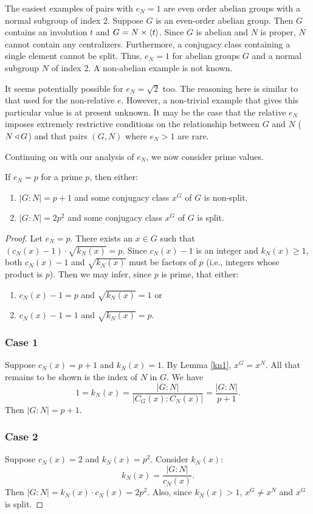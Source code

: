 \documentclass[main.tex]{subfiles}
\begin{document}
The easiest examples of pairs with $e_N = 1$ are even order abelian groups with a normal subgroup of index 2. Suppose $G$ is an even-order abelian group. Then $G$ contains an involution $t$ and $G = N \times \langle t \rangle$. Since $G$ is abelian and $N$ is proper, $N$ cannot contain any centralizers. Furthermore, a conjugacy class containing a single element cannot be split. Thus, $e_N = 1$ for abelian groups $G$ and a normal subgroup $N$ of index 2. A non-abelian example is not known.

It seems potentially possible for $e_N = \sqrt{2}$ too. The reasoning here is similar to that used for the non-relative $e$. However, a non-trivial example that gives this particular value is at present unknown. It may be the case that the relative $e_N$ imposes extremely restrictive conditions on the relationship between $G$ and $N$ ($N \triangleleft G$) and that pairs $(G, N)$ where $e_N > 1$ are rare.

Continuing on with our analysis of $e_N$, we now consider prime values.

\begin{theorem}
If $e_N = p$ for a prime $p$, then either:
\begin{enumerate}
	\item $|G:N| = p + 1$ and some conjugacy class $x^G$ of $G$ is non-split.
	\item $|G:N| = 2p^2$ and some conjugacy class $x^G$ of $G$ is split.
\end{enumerate}
\end{theorem}

\begin{proof}
Let $e_N = p$. There exists an $x \in G$ such that $(c_N(x) - 1) \cdot \sqrt{k_N(x)} = p$. Since $c_N(x) - 1$ is an integer and $k_N(x) \ge 1$, both $c_N(x) - 1$ and $\sqrt{k_N(x)}$ must be factors of $p$ (i.e., integers whose product is $p$). Then we may infer, since $p$ is prime, that either:
\begin{enumerate}
	\item $c_N(x) - 1 = p$ and $\sqrt{k_N(x)} = 1$ or
	\item $c_N(x) - 1 = 1$ and $\sqrt{k_N(x)} = p$.
\end{enumerate}

\subsubsection*{Case 1} Suppose $c_N(x) = p + 1$ and $k_N(x) = 1$. By Lemma \ref{kn1}, $x^G = x^N$. All that remains to be shown is the index of $N$ in $G$. We have
$$1 = k_N(x) = \frac{|G : N|}{|C_G(x):C_N(x)|} = \frac{|G : N|}{p + 1}\text{.}$$
Then $|G:N| = p+1$.

\subsubsection*{Case 2} Suppose $c_N(x) = 2$ and $k_N(x) = p^2$. Consider $k_N(x)$:
$$k_N(x) = \frac{|G:N|}{c_N(x)}\text{.}$$
Then $|G:N| = k_N(x) \cdot c_N(x) = 2p^2$. Also, since $k_N(x) > 1$, $x^G \ne x^N$ and $x^G$ is split.
\end{proof}
\end{document}

